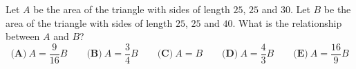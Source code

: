 Let $A$ be the area of the triangle with sides of length $25$, $25$ and $30$. Let $B$ be the area of the triangle with sides of length $25$, $25$ and $40$. What is the relationship between $A$ and $B$?
\[
\textbf{(A)}\ A=\dfrac{9}{16}B\qquad\textbf{(B)}\ A=\dfrac{3}{4}B\qquad\textbf{(C)}\ A=B\qquad\textbf{(D)}\ A=\dfrac{4}{3}B\qquad\textbf{(E)}\ A=\dfrac{16}{9}B
\]
